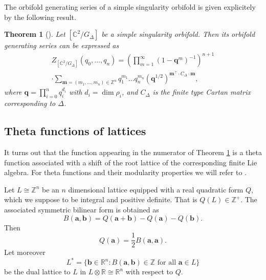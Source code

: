 \documentclass[11pt,a4paper]{amsart}
\newtheorem{theorem}{Theorem}[section]
\theoremstyle{definition}
\newcommand{\SZ}{\mathbb{Z}}                    %
\newcommand{\SR}{\mathbb{R}}                    %
\newcommand{\SC}{\mathbb{C}}                    %
\begin{document}
The orbifold generating series of a simple singularity orbifold is given explicitely by the following result.
\begin{theorem}[\cite{nakajima2002geometric}]  
\label{thm:genfunct}
Let $[\SC^2/G_\Delta]$ be a simple singularity orbifold. Then its orbifold generating series can be expressed as
\begin{multline*} Z_{[\SC^2/G_\Delta]}(q_0,\dots,q_n)=\left(\prod_{m=1}^{\infty}(1-\mathbf{q}^m)^{-1}\right)^{n+1} \\
\cdot\sum_{ \mathbf{m}=(m_1,\dots,m_n) \in \SZ^n } q_1^{m_1}\dots q_n^{m_n}(\mathbf{q}^{1/2})^{\mathbf{m}^\top \cdot C_\Delta \cdot \mathbf{m}},\label{eq:orbi_main_formula}\end{multline*}
where $\mathbf{q}=\prod_{i=0}^n q_i^{d_i}$ with $d_i=\dim\rho_i$, 
and $C_\Delta$ is the finite type Cartan matrix corresponding to $\Delta$.
\end{theorem}






\subsection{Theta functions of lattices}

It turns out that the function appearing in the numerator of Theorem \ref{thm:genfunct} is a theta function associated with a shift of the root lattice of the corresponding finite Lie algebra. For theta functions and their modularity properties we will refer to
\cite[Chapter 14]{cohen2017modular}. %

Let $L\cong \SZ^n$ be an $n$ dimensional lattice equipped with a real quadratic form $Q$, which we suppose to be integral and positive definite. That is $Q(L) \in \SZ^+$. %
The associated symmetric bilinear form is obtained as
\[ B(\mathbf{a},\mathbf{b})= Q(\mathbf{a}+\mathbf{b})-Q(\mathbf{a})-Q(\mathbf{b}). \]
Then
\[ Q(\mathbf{a})=\frac{1}{2}B(\mathbf{a},\mathbf{a}). \]
Let moreover 
\[ L^{\ast} = \{ \mathbf{b}\in \SR^n : B(\mathbf{a},\mathbf{b}) \in \SZ \textrm{ for all } \mathbf{a} \in L \}\] be the dual lattice to $L$ in $L\otimes \SR \cong \SR^n$ with respect to $Q$.
 
\end{document}
